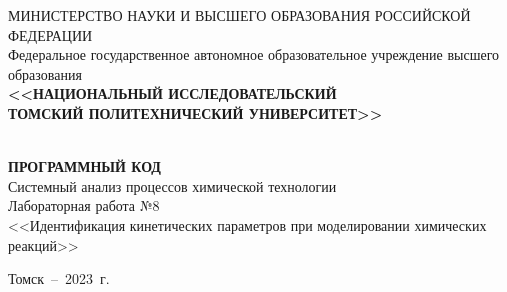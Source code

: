 \begin{titlepage}
	\begin{center}
\sffamily	\small{\MakeUppercase {Министерство науки и высшего образования
			Российской Федерации}}\\
		\footnotesize {Федеральное государственное автономное образовательное учреждение  высшего образования}\\
	\small	\MakeTextUppercase{\textbf{<<Национальный исследовательский} \\ \textbf{Томский политехнический университет>>}} \\
		\hrulefill
		\\[4cm]


		\bigskip

		{
			\Large \MakeUppercase{\textbf{Программный код}} \\

			Системный анализ процессов химической технологии \\
			Лабораторная работа №8 \\
			<<Идентификация кинетических параметров при моделировании химических реакций>>
			\
			 \bigskip



		}

\vspace{0.1\textheight}
\begin{minipage}{0.46\linewidth}
	\hfil
\end{minipage}



		\vfill
		Томск~--~2023~г.
	\end{center}

\end{titlepage}